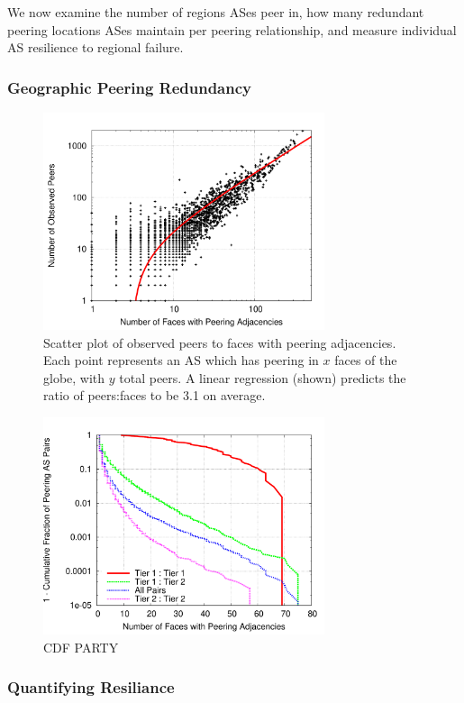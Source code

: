 We now examine the number of regions ASes peer in, how many redundant peering locations ASes maintain per peering relationship, and measure individual AS resilience to regional failure.

\subsubsection*{Geographic Peering Redundancy}
\begin{figure}[tb]
\centering
\includegraphics[width=3.25in]{scatter}
\caption[]{\label{fig:scatter} Scatter plot of observed peers to faces with peering adjacencies. Each point represents an AS which has peering in $x$ faces of the globe, with $y$ total peers. A linear regression (shown) predicts the ratio of peers:faces to be 3.1 on average.} 
\end{figure}


\begin{figure}[tb]
\centering
\includegraphics[width=3.25in]{peering}
\caption[]{CDF PARTY} 
\end{figure}

\subsubsection*{Quantifying Resiliance}
